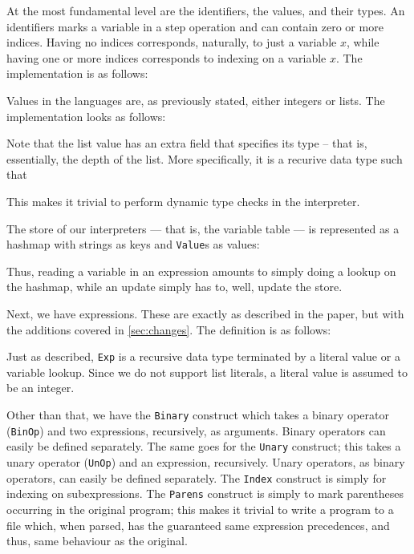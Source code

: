 At the most fundamental level are the identifiers, the values, and their types. An identifiers marks a variable in a step operation and can contain zero or more indices. Having no indices corresponds, naturally, to just a variable $x$, while having one or more indices corresponds to indexing on a variable $x$. The implementation is as follows:

Values in the languages are, as previously stated, either integers or lists. The implementation looks as follows:

Note that the list value has an extra field that specifies its type -- that is, essentially, the depth of the list. More specifically, it is a recurive data type such that

This makes it trivial to perform dynamic type checks in the interpreter.

The store of our interpreters --- that is, the variable table --- is represented as a hashmap with strings as keys and \texttt{Value}s as values:

Thus, reading a variable in an expression amounts to simply doing a lookup on the hashmap, while an update simply has to, well, update the store.

Next, we have expressions. These are exactly as described in the paper, but with the additions covered in \ref{sec:changes}. The definition is as follows:

Just as described, \texttt{Exp} is a recursive data type terminated by a literal value or a variable lookup. Since we do not support list literals, a literal value is assumed to be an integer.


Other than that, we have the \texttt{Binary} construct which takes a binary operator (\texttt{BinOp}) and two expressions, recursively, as arguments. Binary operators can easily be defined separately. The same goes for the \texttt{Unary} construct; this takes a unary operator (\texttt{UnOp}) and an expression, recursively. Unary operators, as binary operators, can easily be defined separately. The \texttt{Index} construct is simply for indexing on subexpressions. The \texttt{Parens} construct is simply to mark parentheses occurring in the original program; this makes it trivial to write a program to a file which, when parsed, has the guaranteed same expression precedences, and thus, same behaviour as the original.

